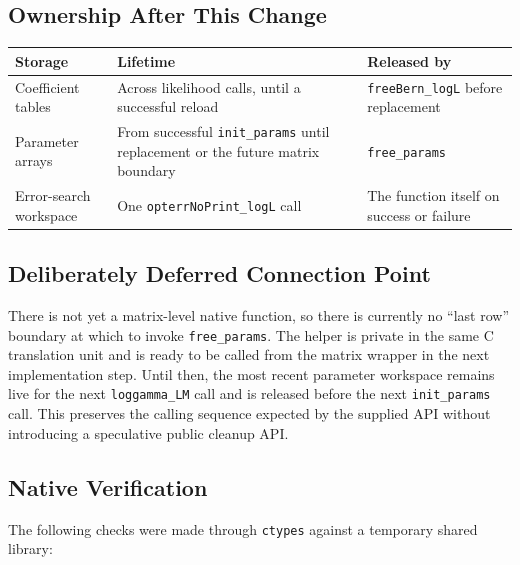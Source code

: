 \documentclass[11pt,a4paper]{article}
\begin{document}
\subsection{Ownership After This Change}

\begin{center}
\begin{tabular}{p{4.2cm} p{5.3cm} p{4.0cm}}
\textbf{Storage} & \textbf{Lifetime} & \textbf{Released by} \\
\hline
Coefficient tables & Across likelihood calls, until a successful reload &
\texttt{freeBern\_logL} before replacement \\
Parameter arrays & From successful \texttt{init\_params} until replacement or
the future matrix boundary & \texttt{free\_params} \\
Error-search workspace & One \texttt{opterrNoPrint\_logL} call & The function
itself on success or failure \\
\end{tabular}
\end{center}

\subsection{Deliberately Deferred Connection Point}

There is not yet a matrix-level native function, so there is currently no
``last row'' boundary at which to invoke \texttt{free\_params}. The helper is
private in the same C translation unit and is ready to be called from the
matrix wrapper in the next implementation step. Until then, the most recent
parameter workspace remains live for the next \texttt{loggamma\_LM} call and is
released before the next \texttt{init\_params} call. This preserves the calling
sequence expected by the supplied API without introducing a speculative public
cleanup API.

\subsection{Native Verification}

The following checks were made through \texttt{ctypes} against a temporary
shared library:
\end{document}
